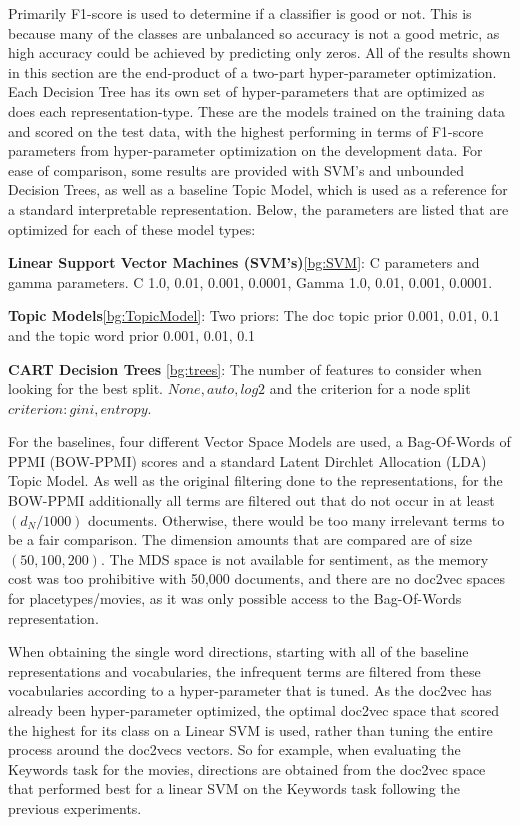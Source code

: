 Primarily F1-score  is used to determine if a classifier is good or not. This is because many of the classes are unbalanced so accuracy is not a good metric, as high accuracy could be achieved by predicting only zeros.  All of the results shown in this section are the end-product of a two-part hyper-parameter optimization. Each Decision Tree has its own set of hyper-parameters that are optimized as does each representation-type. These are the models trained on the training data and scored on the test data, with the highest performing in terms of F1-score parameters from hyper-parameter optimization on the development data. For ease of comparison, some results are provided with SVM's and unbounded Decision Trees, as well as a baseline Topic Model, which is used as a reference for a standard interpretable representation. Below, the parameters are listed that are optimized for each of these model types:

\textbf{Linear Support Vector Machines (SVM's)}\ref{bg:SVM}: C parameters and gamma parameters.
C {1.0, 0.01, 0.001, 0.0001}, Gamma {1.0, 0.01, 0.001, 0.0001}.

\textbf{Topic Models}\ref{bg:TopicModel}: Two priors: The doc topic prior {0.001, 0.01, 0.1} and the topic word prior {0.001, 0.01, 0.1}

\textbf{CART Decision Trees }\ref{bg:trees}: The number of features to consider when looking for the best split. $None, auto, log2$ and the criterion for a node split $criterion: gini, entropy$.
	
For the baselines, four different Vector Space Models are used, a Bag-Of-Words of PPMI (BOW-PPMI) scores and a standard Latent Dirchlet Allocation (LDA) Topic Model. As well as the original filtering done to the representations, for the BOW-PPMI additionally all terms are filtered out that do not occur in at least $(d_N / 1000)$ documents. Otherwise, there would be too many irrelevant terms to be a fair comparison. The dimension amounts that are compared are of size $(50, 100, 200)$.
The MDS space is not available for sentiment, as the memory cost was too prohibitive with 50,000 documents, and there are no doc2vec spaces for placetypes/movies, as it was only possible access to the Bag-Of-Words representation.

When obtaining the single word directions, starting with all of the baseline representations and vocabularies, the infrequent terms are filtered from these vocabularies according to a hyper-parameter that is tuned. As the doc2vec has already been hyper-parameter optimized, the optimal doc2vec space that scored the highest for its class on a Linear SVM is used, rather than tuning the entire process around the doc2vecs vectors. So for example, when evaluating the Keywords task for the movies, directions are obtained from the doc2vec space that performed best for a linear SVM on the Keywords task following the previous experiments. 


